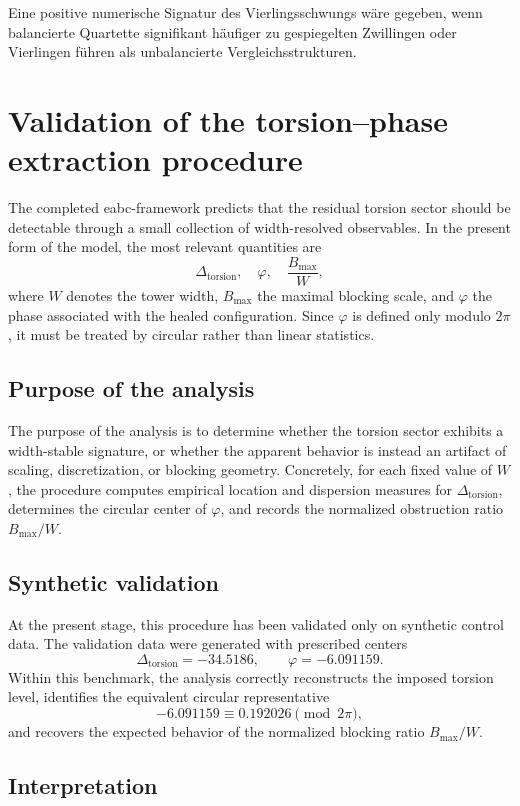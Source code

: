 \documentclass[11pt,a4paper]{article}
\theoremstyle{definition}
\begin{document}
Eine positive numerische Signatur des Vierlingsschwungs wäre gegeben, wenn balancierte Quartette signifikant häufiger zu gespiegelten Zwillingen oder Vierlingen führen als unbalancierte Vergleichsstrukturen.

\section{Validation of the torsion--phase extraction procedure}

The completed eabc-framework predicts that the residual torsion sector should be detectable through a small collection of width-resolved observables. In the present form of the model, the most relevant quantities are
\[
\Delta_{\mathrm{torsion}},\quad \varphi,\quad \frac{B_{\max}}{W},
\]
where $W$ denotes the tower width, $B_{\max}$ the maximal blocking scale, and $\varphi$ the phase associated with the healed configuration. Since $\varphi$ is defined only modulo $2\pi$, it must be treated by circular rather than linear statistics.

\subsection{Purpose of the analysis}

The purpose of the analysis is to determine whether the torsion sector exhibits a width-stable signature, or whether the apparent behavior is instead an artifact of scaling, discretization, or blocking geometry. Concretely, for each fixed value of $W$, the procedure computes empirical location and dispersion measures for $\Delta_{\mathrm{torsion}}$, determines the circular center of $\varphi$, and records the normalized obstruction ratio $B_{\max}/W$.

\subsection{Synthetic validation}

At the present stage, this procedure has been validated only on synthetic control data. The validation data were generated with prescribed centers
\[
\Delta_{\mathrm{torsion}}=-34.5186,\qquad \varphi=-6.091159.
\]
Within this benchmark, the analysis correctly reconstructs the imposed torsion level, identifies the equivalent circular representative
\[
-6.091159\equiv 0.192026\pmod {2\pi},
\]
and recovers the expected behavior of the normalized blocking ratio $B_{\max}/W$.

\subsection{Interpretation}
\end{document}
